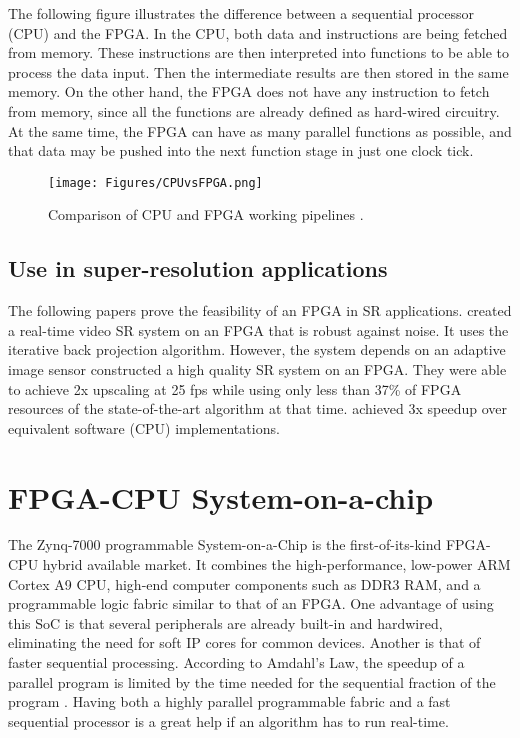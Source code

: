 The following figure illustrates the difference between a sequential processor (CPU) and the FPGA. 
In the CPU, both data and instructions are being fetched from memory. 
These instructions are then interpreted into functions to be able to process the data input.
Then the intermediate results are then stored in the same memory.
On the other hand, the FPGA does not have any instruction to fetch from memory, since all the functions are already defined as hard-wired circuitry. 
At the same time, the FPGA can have as many parallel functions as possible, and that data may be pushed into the next function stage in just one clock tick.

\begin{figure}[!ht]
	\label{fig:CPUvsFPGA}
	\centering
	\texttt{[image: Figures/CPUvsFPGA.png]}
	\caption[]{Comparison of CPU and FPGA working pipelines \citep{Flynn2012}.}
\end{figure}

\subsection{Use in super-resolution applications}
The following papers prove the feasibility of an FPGA in SR applications.
\cite{Angelopoulou2009} created a real-time video SR system on an FPGA that is robust against noise.
It uses the iterative back projection algorithm. 
However, the system depends on an adaptive image sensor 
\cite{Szydzik2011} constructed a high quality SR system on an FPGA. 
They were able to achieve 2x upscaling at 25 fps while using only less than 37\% of FPGA resources of the state-of-the-art algorithm at that time.
\cite{Bowen2008} achieved 3x speedup over equivalent software (CPU) implementations.


\section{FPGA-CPU System-on-a-chip}

The Zynq-7000 programmable System-on-a-Chip is the first-of-its-kind FPGA-CPU hybrid available market.
It combines the high-performance, low-power ARM Cortex A9 CPU, high-end computer components such as DDR3 RAM, and a programmable logic fabric similar to that of an FPGA.
One advantage of using this SoC is that several peripherals are already built-in and hardwired, eliminating the need for soft IP cores for common devices.
Another is that of faster sequential processing. 
According to Amdahl's Law, the speedup of a parallel program is limited by the time needed for the sequential fraction of the program \citep{Amdahl1967}.
Having both a highly parallel programmable fabric and a fast sequential processor is a great help if an algorithm has to run real-time.